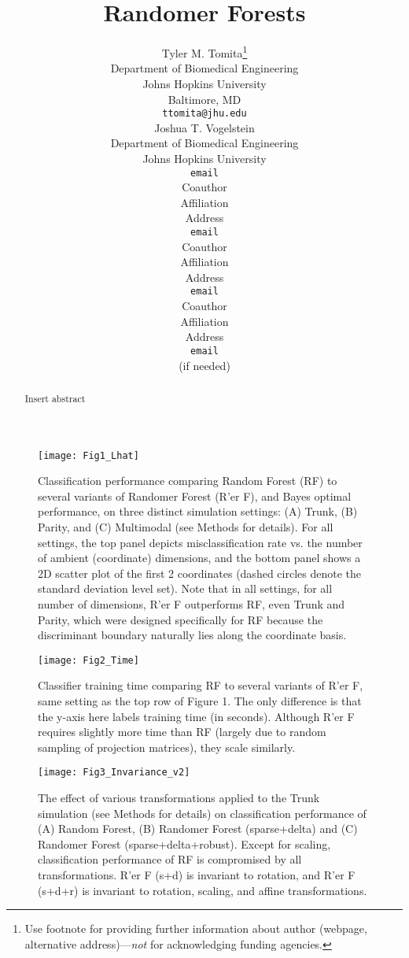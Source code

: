 \documentclass{article} %
\title{Randomer Forests}
\author{
Tyler M. Tomita\thanks{ Use footnote for providing further information
about author (webpage, alternative address)---\emph{not} for acknowledging
funding agencies.} \\
Department of Biomedical Engineering\\
Johns Hopkins University\\
Baltimore, MD \\
\texttt{ttomita@jhu.edu} \\
\And
Joshua T. Vogelstein \\
Department of Biomedical Engineering \\
Johns Hopkins University \\
\texttt{email} \\
\AND
Coauthor \\
Affiliation \\
Address \\
\texttt{email} \\
\And
Coauthor \\
Affiliation \\
Address \\
\texttt{email} \\
\And
Coauthor \\
Affiliation \\
Address \\
\texttt{email} \\
(if needed)\\
}
\begin{document}
\maketitle

\begin{abstract}
Insert abstract
\end{abstract}


\begin{figure}[h]
\begin{center}
\texttt{[image: Fig1\_Lhat]}
\end{center}
\caption{Classification performance comparing Random Forest (RF) to several variants of Randomer Forest (R'er F), and Bayes optimal performance, on three distinct simulation settings: (A) Trunk, (B) Parity, and (C) Multimodal (see Methods for details).  For all settings, the top panel depicts misclassification rate vs. the number of ambient (coordinate) dimensions, and the bottom panel shows a 2D scatter plot of the first 2 coordinates (dashed circles denote the standard deviation level set).  Note that in all settings, for all number of dimensions, R'er F outperforms RF, even Trunk and Parity, which were designed specifically for RF because the discriminant boundary naturally lies along the coordinate basis.}
\end{figure}

\begin{figure}[h]
\begin{center}
\texttt{[image: Fig2\_Time]}
\end{center}
\caption{Classifier training time comparing RF to several variants of R'er F, same setting as the top row of Figure 1. The only difference is that the y-axis here labels training time (in seconds). Although R'er F requires slightly more time than RF (largely due to random sampling of projection matrices), they scale similarly.}
\end{figure}

\begin{figure}[h]
\begin{center}
\texttt{[image: Fig3\_Invariance\_v2]}
\end{center}
\caption{The effect of various transformations applied to the Trunk simulation (see Methods for details) on classification performance of (A) Random Forest, (B) Randomer Forest (sparse+delta) and (C) Randomer Forest (sparse+delta+robust). Except for scaling, classification performance of RF is compromised by all transformations. R'er F (s+d) is invariant to rotation, and R'er F (s+d+r) is invariant to rotation, scaling, and affine transformations.}
\end{figure}
\end{document}
